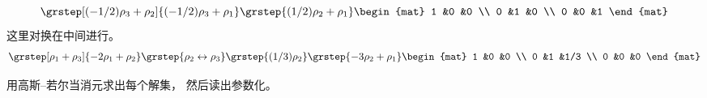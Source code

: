 \begin{exercises}
\begin{answer}
\begin{exparts}
\begin{equation*}
            \grstep[(-1/2)\rho_3+\rho_2]{(-1/2)\rho_3+\rho_1}
            \grstep{(1/2)\rho_2+\rho_1}
            \begin{mat}
              1 &0 &0 \\
              0 &1 &0 \\
              0 &0 &1
            \end{mat}
          \end{equation*}
        \partsitem 这里对换在中间进行。
        \begin{equation*}
          \grstep[\rho_1+\rho_3]{-2\rho_1+\rho_2}
          \grstep{\rho_2\leftrightarrow\rho_3}
          \grstep{(1/3)\rho_2}
          \grstep{-3\rho_2+\rho_1}
          \begin{mat}
            1 &0 &0   \\
            0 &1 &1/3 \\
            0 &0 &0
          \end{mat}
        \end{equation*}
      \end{exparts}
    \end{answer}
  \recommended \item 
    用高斯–若尔当消元求出每个解集，
    然后读出参数化。
\end{exercises}

